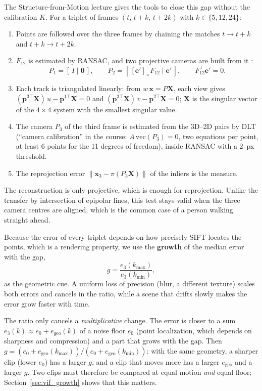 \documentclass[11pt,a4paper]{article}
\newcommand{\x}{\mathbf{x}}
\newcommand{\X}{\mathbf{X}}
\begin{document}
The Structure-from-Motion lecture gives the tools to close this gap without the calibration
$K$. For a triplet of frames $(t,\,t+k,\,t+2k)$ with $k\in\{5,12,24\}$:
\begin{enumerate}
  \item Points are followed over the three frames by chaining the matches $t\to t+k$ and
        $t+k\to t+2k$.
  \item $F_{12}$ is estimated by RANSAC, and two projective cameras are built from it
        \cite[result 9.14]{hartley2004}:
        \begin{equation}
          P_1=[\,I\mid \mathbf{0}\,],\qquad P_2=[\,[\mathbf{e}']_\times F_{12}\mid \mathbf{e}'\,],
          \qquad F_{12}^\top\mathbf{e}'=0 .
        \end{equation}
  \item Each track is triangulated linearly: from $w\,\x=P\X$, each view gives
        $(\mathbf{p}^{3\top}\X)\,u-\mathbf{p}^{1\top}\X=0$ and
        $(\mathbf{p}^{3\top}\X)\,v-\mathbf{p}^{2\top}\X=0$; $\X$ is the singular vector of the
        $4\times4$ system with the smallest singular value.
  \item The camera $P_3$ of the third frame is estimated from the 3D--2D pairs by DLT
        (``camera calibration'' in the course: $A\,\mathrm{vec}(P_3)=0$, two equations per point,
        at least 6 points for the 11 degrees of freedom), inside RANSAC with a 2~px threshold.
  \item The reprojection error $\|\x_3-\pi(P_3\X)\|$ of the inliers is the measure.
\end{enumerate}
The reconstruction is only projective, which is enough for reprojection. Unlike the transfer
by intersection of epipolar lines, this test stays valid when the three camera centres are
aligned, which is the common case of a person walking straight ahead.

Because the error of every triplet depends on how precisely SIFT locates the points, which is
a rendering property, we use the \textbf{growth} of the median error with the gap,
\begin{equation}
  g = \frac{e_3(k_{\max})}{e_3(k_{\min})},
\end{equation}
as the geometric cue. A uniform loss of precision (blur, a different texture) scales both
errors and cancels in the ratio, while a scene that drifts slowly makes the error grow faster
with time.

\label{sec:methods_growth}The ratio only cancels a \emph{multiplicative} change. The error is closer to a sum
$e_3(k)\approx e_0+e_{\mathrm{geo}}(k)$ of a noise floor $e_0$ (point localization, which
depends on sharpness and compression) and a part that grows with the gap. Then
$g=(e_0+e_{\mathrm{geo}}(k_{\max}))/(e_0+e_{\mathrm{geo}}(k_{\min}))$: with the same geometry, a
sharper clip (lower $e_0$) has a larger $g$, and a clip that moves more has a larger
$e_{\mathrm{geo}}$ and a larger $g$. Two clips must therefore be compared at equal motion
\emph{and} equal floor; Section~\ref{sec:vif_growth} shows that this matters.
\end{document}

